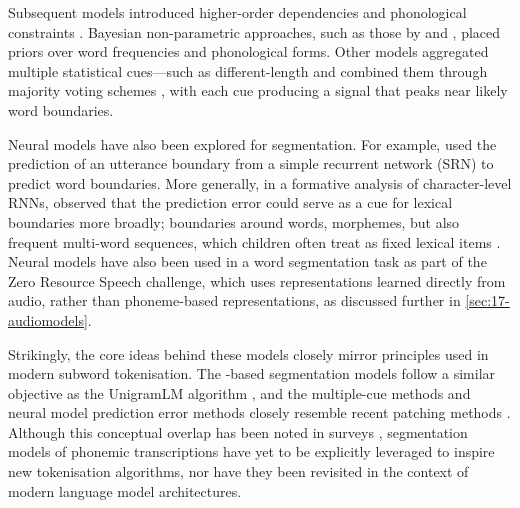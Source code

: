 
Subsequent models introduced higher-order \ngram dependencies \citep{Venkataraman2001} and phonological constraints \citep{Blanchard2010}. Bayesian non-parametric approaches, such as those by \citet{Goldwater2009} and \citet{algayres_dp-parse_2022}, placed priors over word frequencies and phonological forms. Other models aggregated multiple statistical cues—such as different-length \ngrams and combined them through majority voting schemes \citep{ccoltekin2014explicit, Coltekin2017, goriely2023word}, with each cue producing a signal that peaks near likely word boundaries.


Neural models have also been explored for segmentation. For example, \citet{christiansen1998learning} used the prediction of an utterance boundary from a simple recurrent network (SRN) to predict word boundaries. More generally, in a formative analysis of character-level RNNs, \citet{elman1990finding} observed that the prediction error could serve as a cue for lexical boundaries more broadly; boundaries around words, morphemes, but also frequent multi-word sequences, which children often treat as fixed lexical items \citep{macwhinney1978}. Neural models have also been used in a word segmentation task as part of the Zero Resource Speech challenge, which uses representations learned directly from audio, rather than phoneme-based representations, as discussed further in \cref{sec:17-audiomodels}.

Strikingly, the core ideas behind these models closely mirror principles used in modern subword tokenisation. The \ngram-based segmentation models follow a similar objective as the UnigramLM algorithm \citep{kudo-2018-unigram}, and the multiple-cue methods and neural model prediction error methods closely resemble recent patching methods \citep{pagnoni2024byte}. Although this conceptual overlap has been noted in surveys \citep{mielke2021between}, segmentation models of phonemic transcriptions have yet to be explicitly leveraged to inspire new tokenisation algorithms, nor have they been revisited in the context of modern language model architectures.

